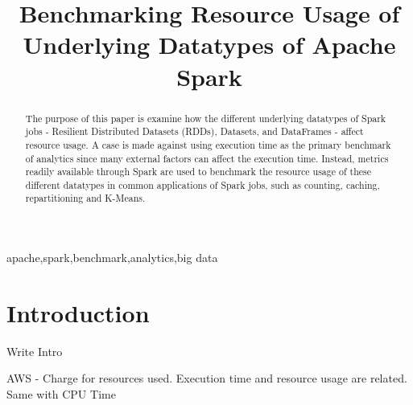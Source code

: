 \documentclass[conference]{IEEEtran}
\begin{document}
\title{Benchmarking Resource Usage of Underlying Datatypes of Apache Spark\\
}

\author{
\and
{}
\and
{}
}

\maketitle

\begin{abstract}
The purpose of this paper is examine how the different underlying datatypes of Spark jobs - Resilient Distributed Datasets (RDDs),
Datasets, and DataFrames - affect resource usage.
A case is made against using execution time as the primary benchmark of analytics since many external factors can affect the execution time.
Instead, metrics readily available through Spark are used to benchmark the resource usage of these different datatypes in common applications of Spark jobs, such as counting, caching, repartitioning and K-Means.
\end{abstract}

\begin{IEEEkeywords}
apache,spark,benchmark,analytics,big data
\end{IEEEkeywords}

\section{Introduction}
Write Intro

AWS - Charge for resources used.  Execution time and resource usage are related.  Same with CPU Time

\end{document}
